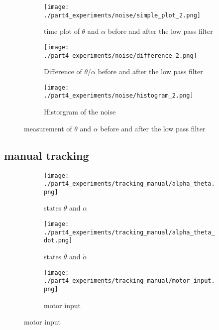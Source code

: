 	\begin{figure}[H]
		\centering
		\begin{subfigure}[b]{0.40\textwidth}
			\texttt{[image: ./part4\_experiments/noise/simple\_plot\_2.png]}
			\caption{time plot of $\theta$ and $\alpha$ before and after the low pass filter}
			\label{fig:time plot theta and alpha}
		\end{subfigure}
		\begin{subfigure}[b]{0.40\textwidth}
			\texttt{[image: ./part4\_experiments/noise/difference\_2.png]}
			\caption{Difference of $\theta$/$\alpha$ before and after the low pass filter}
			\label{fig:time plot noise}
		\end{subfigure}
		\begin{subfigure}[b]{0.40\textwidth}
			\texttt{[image: ./part4\_experiments/noise/histogram\_2.png]}
			\caption{Historgram of the noise}
			\label{fig:hist noise}
		\end{subfigure}
		\caption{measurement of $\theta$ and $\alpha$ before and after the low pass filter}
	\end{figure}

\subsection{manual tracking}
	\begin{figure}[H]
		\centering
		\begin{subfigure}[b]{0.45\textwidth}
			\texttt{[image: ./part4\_experiments/tracking\_manual/alpha\_theta.png]}
			\caption{states $\theta$ and $\alpha$}
		\end{subfigure}
		\begin{subfigure}[b]{0.45\textwidth}
			\texttt{[image: ./part4\_experiments/tracking\_manual/alpha\_theta\_dot.png]}
			\caption{states $\dot{\theta}$ and $\dot{\alpha}$}
		\end{subfigure}
		\begin{subfigure}[b]{0.45\textwidth}
			\texttt{[image: ./part4\_experiments/tracking\_manual/motor\_input.png]}
			\caption{motor input}
		\end{subfigure}
	\end{figure}
